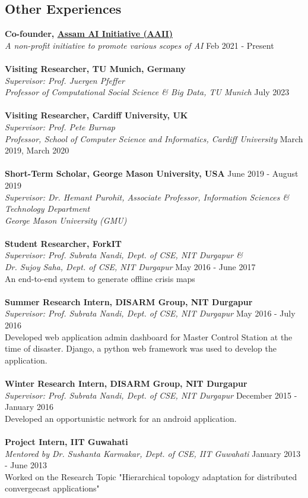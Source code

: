 \documentclass[margin, centered,lmodern]{res}
\begin{document}
\begin{resume}
\section{Other Experiences}
\textbf{Co-founder,  \href{https://aaii-axom.github.io/}{Assam AI Initiative (AAII)}} \\
\emph{A non-profit initiative to promote various scopes of AI} \hfill Feb 2021 - Present \\
\\
\textbf{Visiting Researcher, TU Munich, Germany} \\
\emph{Supervisor: Prof. Juergen Pfeffer\\ Professor of Computational Social Science \& Big Data, TU Munich} \hfill July 2023 \\
\\
\textbf{Visiting Researcher, Cardiff University, UK} \\
\emph{Supervisor: Prof. Pete Burnap \\ Professor, School of Computer Science and Informatics, Cardiff University} \hfill March 2019,  March 2020 \\
\\
\textbf{Short-Term Scholar, George Mason University, USA} \hfill June 2019 - August 2019\\
\emph{Supervisor: Dr. Hemant Purohit,  Associate Professor, Information Sciences \& Technology Department \\ George Mason University (GMU)}  \\
\\
\textbf{Student Researcher, ForkIT} \\
\emph{Supervisor: {Prof. Subrata Nandi, Dept. of CSE, NIT Durgapur} \& \\ {Dr. Sujoy Saha, Dept. of CSE, NIT Durgapur}} \hfill May 2016 - June 2017 \\
An end-to-end system to generate offline crisis maps \\
\\
\textbf{Summer Research Intern, DISARM Group, NIT Durgapur} \\
\emph{Supervisor: {Prof. Subrata Nandi, Dept. of CSE, NIT Durgapur}} \hfill May 2016 - July 2016 \\
Developed web application admin dashboard for Master Control Station at the time of disaster. Django, a python web framework was used to develop the application.\\
\\
\textbf{Winter Research Intern, DISARM Group, NIT Durgapur} \\
\emph{Supervisor: {Prof. Subrata Nandi, Dept. of CSE, NIT Durgapur}} \hfill December 2015 - January 2016 \\
Developed an opportunistic network for an android application.
\\
\\
\textbf{Project Intern, IIT Guwahati}  \\
\emph{Mentored by {Dr. Sushanta Karmakar, Dept. of CSE, IIT Guwahati}} \hfill January 2013 - June 2013 \\
Worked on the Research Topic "Hierarchical topology adaptation for distributed convergecast applications"



\end{resume}
\end{document}
